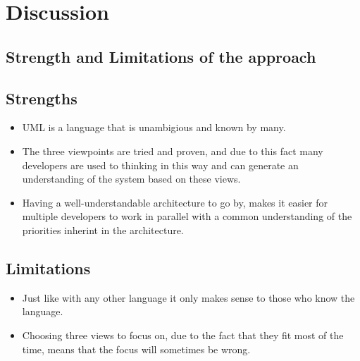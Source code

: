 \documentclass[a4paper,10pt]{article}
\begin{document}
\section{Discussion}
\subsection{Strength and Limitations of the approach}
\subsection{Strengths}
\begin{itemize}
\item UML is a language that is unambigious and known by many.
\item The three viewpoints are tried and proven, and due to this fact many developers are used to thinking in this way and can generate an understanding of the system based on these views.
 \item Having a well-understandable architecture to go by, makes it easier for multiple developers to work in parallel with a common understanding of the priorities inherint in the architecture.
\end{itemize}

\subsection{Limitations}
\begin{itemize}
\item Just like with any other language it only makes sense to those who know the language. 
\item Choosing three views to focus on, due to the fact that they fit most of the time, means that the focus will sometimes be wrong.
\end{itemize}
\end{document}
